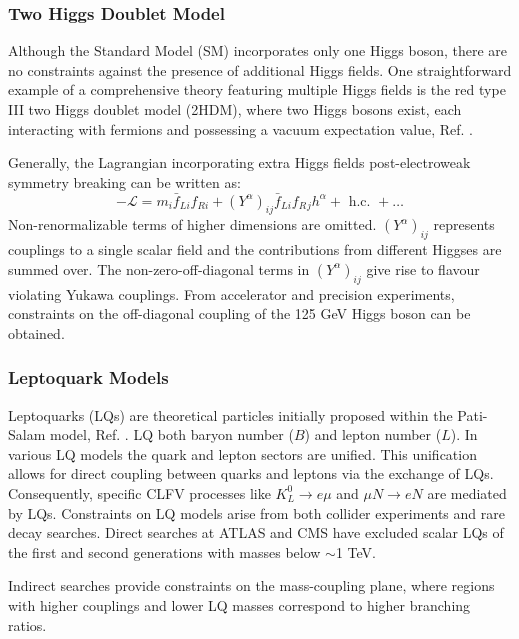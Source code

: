 \subsubsection{Two Higgs Doublet Model}\label{2higgs}
Although the Standard Model (SM) incorporates only one Higgs boson, there are no constraints against the presence of additional Higgs fields. One straightforward example of a comprehensive theory featuring multiple Higgs fields is the {red type III} two Higgs doublet model (2HDM), where two Higgs bosons exist, each interacting with fermions and possessing a vacuum expectation value, Ref. \cite{Harnik_2013}.



Generally, the Lagrangian incorporating extra Higgs fields post-electroweak symmetry breaking can be written as:
\begin{equation}
-\mathscr{L}=m_i \bar{f}_{L i} f_{R i}+\left(Y^\alpha\right)_{i j} \bar{f}_{L i} f_R{ }_j h^\alpha+\text { h.c. }+\ldots
\end{equation}
Non-renormalizable terms of higher dimensions are omitted. $(Y^\alpha)_{i j}$ represents couplings to a single scalar field and the contributions from different Higgses are summed over. The non-zero-off-diagonal terms in $(Y^\alpha)_{i j}$ give rise to flavour violating Yukawa couplings. From accelerator and precision experiments, constraints on the off-diagonal coupling of the 125 GeV Higgs boson can be obtained.
\subsubsection{Leptoquark Models}
Leptoquarks (LQs) are \rm{theoretical} particles initially proposed within the Pati-Salam model, Ref. \cite{PhysRevD.10.275}.  LQ  both  baryon number ($B$) and  lepton number ($L$). In various LQ models the quark and lepton sectors are unified. This unification allows for direct coupling between quarks and leptons via the exchange of LQs. Consequently, specific CLFV processes like $K_L^0 \rightarrow e \mu$ and $\mu N \rightarrow e N$ are mediated by LQs. Constraints on LQ models arise from both collider experiments and rare decay searches. Direct searches at ATLAS and CMS have excluded scalar LQs of the first and second generations with masses below $\sim$1 TeV.

{\violet Indirect searches provide constraints on the mass-coupling plane, where regions with higher couplings and lower LQ masses correspond to higher branching ratios.}

